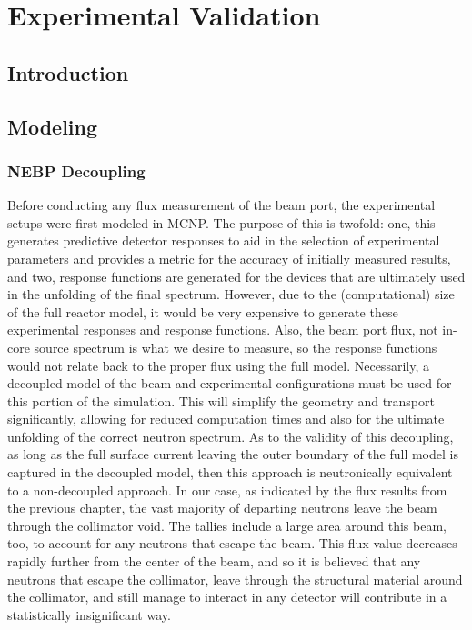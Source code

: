 
\cleardoublepage


\chapter{Experimental Validation}


\section{Introduction}

\section{Modeling}

\subsection{NEBP Decoupling}

Before conducting any flux measurement of the beam port, the experimental setups were first modeled in MCNP.
The purpose of this is twofold: one, this generates predictive detector responses to aid in the selection of experimental parameters and provides a metric for the accuracy of initially measured results, and two, response functions are generated for the devices that are ultimately used in the unfolding of the final spectrum.
However, due to the (computational) size of the full reactor model, it would be very expensive to generate these experimental responses and response functions.
Also, the beam port flux, not in-core source spectrum is what we desire to measure, so the response functions would not relate back to the proper flux using the full model.
Necessarily, a decoupled model of the beam and experimental configurations must be used for this portion of the simulation.
This will simplify the geometry and transport significantly, allowing for reduced computation times and also for the ultimate unfolding of the correct neutron spectrum.
As to the validity of this decoupling, as long as the full surface current leaving the outer boundary of the full model is captured in the decoupled model, then this approach is neutronically equivalent to a non-decoupled approach.
In our case, as indicated by the flux results from the previous chapter, the vast majority of departing neutrons leave the beam through the collimator void.
The tallies include a large area around this beam, too, to account for any neutrons that escape the beam.
This flux value decreases rapidly further from the center of the beam, and so it is believed that any neutrons that escape the collimator, leave through the structural material around the collimator, and still manage to interact in any detector will contribute in a statistically insignificant way.

